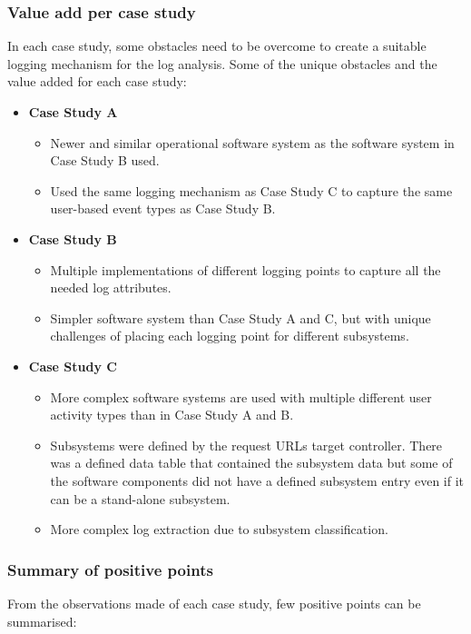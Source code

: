 \subsubsection{Value add per case study}
In each case study, some obstacles need to be overcome to create a suitable logging mechanism for the log analysis. Some of the unique obstacles and the value added for each case study:

\begin{itemize}
	\item \textbf{Case Study A}
		\begin{itemize}
			\item Newer and similar operational software system as the software system in Case Study B used.
			\item Used the same logging mechanism as Case Study C to capture the same user-based event types as Case Study B.
		\end{itemize}
	\item \textbf{Case Study B}
	\begin{itemize}
		\item Multiple implementations of different logging points to capture all the needed log attributes.
		\item Simpler software system than Case Study A and C, but with unique challenges of placing each logging point for different subsystems.
	\end{itemize}
	\item \textbf{Case Study C}
	\begin{itemize}
		\item More complex software systems are used with multiple different user activity types than in Case Study A and B.
		\item Subsystems were defined by the request URLs target controller. There was a defined data table that contained the subsystem data but some of the software components did not have a defined subsystem entry even if it can be a stand-alone subsystem.
		\item More complex log extraction due to subsystem classification.
	\end{itemize}
\end{itemize}

\subsubsection{Summary of positive points}
From the observations made of each case study, few positive points can be summarised:

